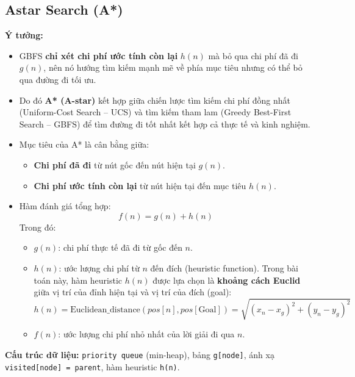 \subsection{Astar Search (A*)}

\textbf{Ý tưởng:}
\begin{itemize}
    \item GBFS \textbf{chỉ xét chi phí ước tính còn lại} $h(n)$ mà bỏ qua chi phí đã đi $g(n)$, nên nó hướng tìm kiếm mạnh mẽ về phía mục tiêu nhưng có thể bỏ qua đường đi tối ưu.
    \item Do đó \textbf{A* (A-star)} kết hợp giữa chiến lược tìm kiếm chi phí đồng nhất (Uniform-Cost Search – UCS) và tìm kiếm tham lam (Greedy Best-First Search – GBFS) để tìm đường đi tốt nhất kết hợp cả thực tế và kinh nghiệm.
    \item Mục tiêu của A* là cân bằng giữa:
    \begin{itemize}
        \item \textbf{Chi phí đã đi} từ nút gốc đến nút hiện tại $g(n)$.
        \item \textbf{Chi phí ước tính còn lại} từ nút hiện tại đến mục tiêu $h(n)$.
    \end{itemize}
    \item Hàm đánh giá tổng hợp:
    \[
        f(n) = g(n) + h(n)
    \]
    Trong đó:
    \begin{itemize}
        \item $g(n)$: chi phí thực tế đã đi từ gốc đến $n$.
        \item $h(n)$: ước lượng chi phí từ $n$ đến đích (heuristic function). Trong bài toán này, hàm heuristic $h(n)$ được lựa chọn là \textbf{khoảng cách Euclid} giữa vị trí của đỉnh hiện tại và vị trí của đích (goal):
        \[
        h(n) = \text{Euclidean\_distance}(pos[n], pos[\text{Goal}]) = 
        \sqrt{(x_n - x_g)^2 + (y_n - y_g)^2}
        \]
        \item $f(n)$: ước lượng chi phí nhỏ nhất của lời giải đi qua $n$.
    \end{itemize}
\end{itemize}

\textbf{Cấu trúc dữ liệu:} 
\texttt{priority queue} (min-heap), bảng \texttt{g[node]}, ánh xạ \texttt{visited[node] = parent}, hàm heuristic \texttt{h(n)}.

